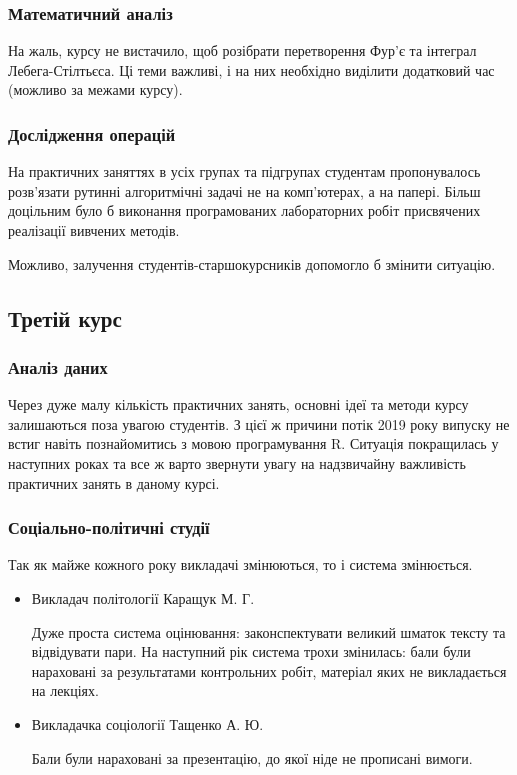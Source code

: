 \documentclass[14pt, a4paper]{extarticle}  %
\begin{document}
\subsubsection{Математичний аналіз}

На жаль, курсу не вистачило, щоб розібрати перетворення Фур'є та інтеграл Лебега-Стілтьєса. Ці теми важливі, і на них необхідно виділити додатковий час (можливо за межами курсу). 

\subsubsection{Дослідження операцій}

На практичних заняттях в усіх групах та підгрупах студентам пропонувалось розв'язати рутинні алгоритмічні задачі не на комп'ю\-терах, а на папері. Більш доцільним було б виконання програмованих лабораторних робіт присвячених реалізації вивчених методів. 

Можливо, залучення студентів-старшокурсників допомогло б змінити ситуацію. 

\subsection{Третій курс}
\subsubsection{Аналіз даних}

Через дуже малу кількість практичних занять, основні ідеї та методи курсу залишаються поза увагою студентів. З цієї ж причини потік 2019 року випуску не встиг навіть познайомитись з мовою програмування R. Ситуація покращилась у наступних роках та все ж варто звернути увагу на надзвичайну важливість практичних занять в даному курсі. 

\subsubsection{Соціально-політичні студії}
Так як майже кожного року викладачі змінюються, то і система змінюється. 
\begin{itemize}
\item Викладач політології Каращук М. Г.

Дуже проста система оцінювання: законспектувати великий шматок тексту та відвідувати пари. На наступний рік система трохи змінилась: бали були нараховані за результатами контрольних робіт, матеріал яких не викладається на лекціях.

\item Викладачка соціології Тащенко А. Ю. 

Бали були нараховані за презентацію, до якої ніде не прописані вимоги. 
\end{itemize}
\end{document}
